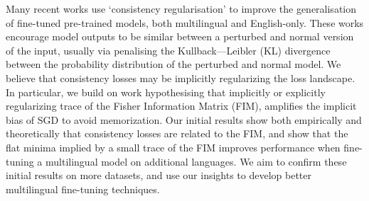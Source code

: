 Many recent works use `consistency regularisation' to improve the generalisation of fine-tuned pre-trained models, both multilingual and English-only. These works encourage model outputs to be similar between a perturbed and normal version of the input, usually via penalising the Kullback---Leibler (KL) divergence between the probability distribution of the perturbed and normal model. We believe that consistency losses may be implicitly regularizing the loss landscape. In particular, we build on work hypothesising that implicitly or explicitly regularizing trace of the Fisher Information Matrix (FIM), amplifies the implicit bias of SGD to avoid memorization. Our initial results show both empirically and theoretically that consistency losses are related to the FIM, and show that the flat minima implied by a small trace of the FIM improves performance when fine-tuning a multilingual model on additional languages. We aim to confirm these initial results on more datasets, and use our insights to develop better multilingual fine-tuning techniques.
